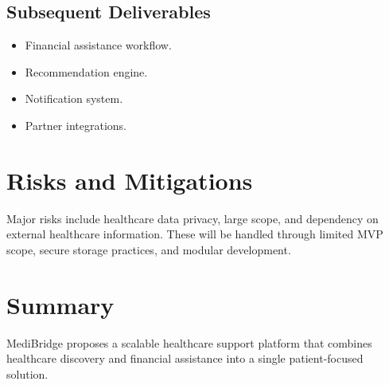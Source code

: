 \documentclass[12pt,a4paper]{article}
\begin{document}
\subsection{Subsequent Deliverables}

\begin{itemize}
    \item Financial assistance workflow.
    \item Recommendation engine.
    \item Notification system.
    \item Partner integrations.
\end{itemize}

\section{Risks and Mitigations}

Major risks include healthcare data privacy, large scope, and dependency
on external healthcare information. These will be handled through
limited MVP scope, secure storage practices, and modular development.

\section{Summary}

MediBridge proposes a scalable healthcare support platform that combines
healthcare discovery and financial assistance into a single
patient-focused solution.
\end{document}
